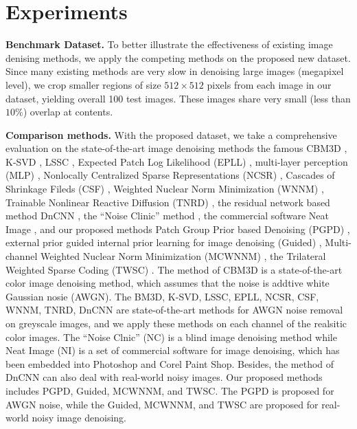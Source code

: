 


\section{Experiments}

\textbf{Benchmark Dataset.} To better illustrate the effectiveness of existing image denising methods, we apply the competing methods on the proposed new dataset. Since many existing methods are very slow in denoising large images (megapixel level), we crop smaller regions of size $512\times512$ pixels from each image in our dataset, yielding overall 100 test images. These images share very small (less than $10\%$) overlap at contents.

\textbf{Comparison methods.} With the proposed dataset, we take a comprehensive evaluation on the state-of-the-art image denoising methods the famous CBM3D \cite{cbm3d}, K-SVD \cite{ksvd}, LSSC \cite{lssc}, Expected Patch Log Likelihood (EPLL) \cite{epll}, multi-layer perception (MLP) \cite{mlp}, Nonlocally Centralized Sparse Representations (NCSR) \cite{ncsr}, Cascades of Shrinkage Fileds (CSF) \cite{csf}, Weighted Nuclear Norm Minimization (WNNM) \cite{wnnm}, Trainable Nonlinear Reactive Diffusion (TNRD) \cite{tnrd}, the residual network based method DnCNN \cite{dncnn}, the ``Noise Clinic'' method \cite{noiseclinic,ncwebsite}, the commercial software Neat Image \cite{neatimage}, and our proposed methods Patch Group Prior based Denoising (PGPD) \cite{pgpd}, external prior guided internal prior learning for image denoising (Guided) \cite{guided}, Multi-channel Weighted Nuclear Norm Minimization (MCWNNM) \cite{mcwnnm}, the Trilateral Weighted Sparse Coding (TWSC) \cite{twsc}. The method of CBM3D is a state-of-the-art color image denoising method, which assumes that the noise is addtive white Gaussian nosie (AWGN). The BM3D, K-SVD, LSSC, EPLL, NCSR, CSF, WNNM, TNRD, DnCNN are state-of-the-art methods for AWGN noise removal on greyscale images, and we apply these methods on each channel of the realsitic color images.  The ``Noise Clnic'' (NC) is a blind image denoising method while Neat Image (NI) is a set of commercial software for image denoising, which has been embedded into Photoshop and Corel Paint Shop. Besides, the method of DnCNN \cite{dncnn} can also deal with real-world noisy images. Our proposed methods includes PGPD, Guided, MCWNNM, and TWSC. The PGPD is proposed for AWGN noise, while the Guided, MCWNNM, and TWSC are proposed for real-world noisy image denoising.

